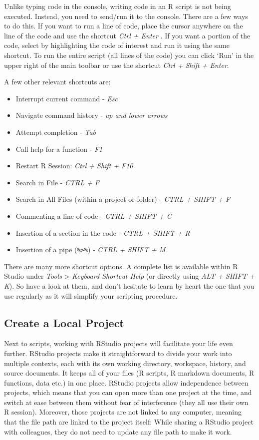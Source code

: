 \documentclass[
]{krantz}
\providecommand{\tightlist}{%
  \setlength{\itemsep}{0pt}\setlength{\parskip}{0pt}}
\begin{document}
Unlike typing code in the console, writing code in an R script is not being executed. Instead, you need to send/run it to the console. There are a few ways to do this. If you want to run a line of code, place the cursor anywhere on the line of the code and use the shortcut \emph{Ctrl + Enter} . If you want a portion of the code, select by highlighting the code of interest and run it using the same shortcut. To run the entire script (all lines of the code) you can click `Run' in the upper right of the main toolbar or use the shortcut \emph{Ctrl + Shift + Enter}.

A few other relevant shortcuts are:

\begin{itemize}
\tightlist
\item
  Interrupt current command - \emph{Esc}
\item
  Navigate command history - \emph{up and lower arrows}
\item
  Attempt completion - \emph{Tab}
\item
  Call help for a function - \emph{F1}
\item
  Restart R Session: \emph{Ctrl + Shift + F10}
\item
  Search in File - \emph{CTRL + F}
\item
  Search in All Files (within a project or folder) - \emph{CTRL + SHIFT + F}
\item
  Commenting a line of code - \emph{CTRL + SHIFT + C}
\item
  Insertion of a section in the code - \emph{CTRL + SHIFT + R}
\item
  Insertion of a pipe (\texttt{\%\textgreater{}\%}) - \emph{CTRL + SHIFT + M}
\end{itemize}

There are many more shortcut options. A complete list is available within R Studio under \emph{Tools} \textgreater{} \emph{Keyboard Shortcut Help} (or directly using \emph{ALT + SHIFT + K}). So have a look at them, and don't hesitate to learn by heart the one that you use regularly as it will simplify your scripting procedure.

\hypertarget{rprojects}{%
\subsection{Create a Local Project}\label{rprojects}}

Next to scripts, working with RStudio projects will facilitate your life even further. RStudio projects make it straightforward to divide your work into multiple contexts, each with its own working directory, workspace, history, and source documents. It keeps all of your files (R scripts, R markdown documents, R functions, data etc.) in one place. RStudio projects allow independence between projects, which means that you can open more than one project at the time, and switch at ease between them without fear of interference (they all use their own R session). Moreover, those projects are not linked to any computer, meaning that the file path are linked to the project itself: While sharing a RStudio project with colleagues, they do not need to update any file path to make it work.
\end{document}
